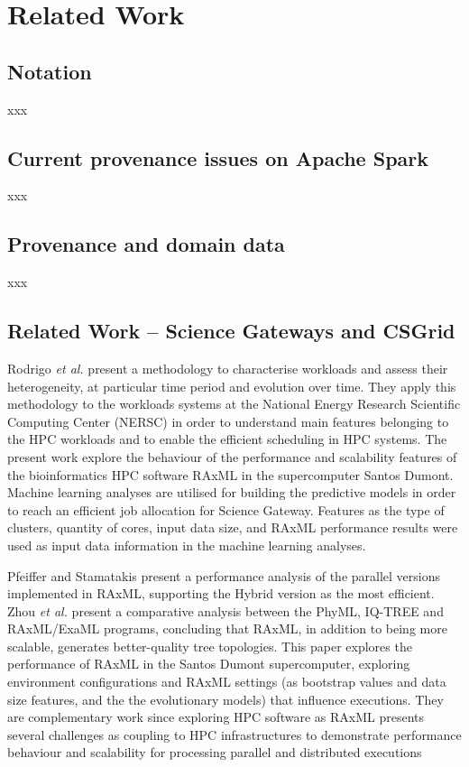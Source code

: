 \section{Related Work}\label{sec:background}


\subsection{Notation}

xxx


\subsection{Current provenance issues on Apache Spark}

xxx

\subsection{Provenance and domain data}\label{sec:provenance}

xxx

\subsection{Related Work -- Science Gateways and CSGrid}\label{sec:related}

Rodrigo \textit{et al.}
\cite{RODRIGO2018206} present a methodology to characterise workloads and assess their heterogeneity, at particular time period and evolution over time. They apply this methodology to the workloads systems at the National Energy Research Scientific Computing Center (NERSC) in order to understand main features belonging to the HPC workloads and to enable the efficient scheduling in HPC systems. The present work explore the behaviour of the performance and scalability features of the bioinformatics HPC software RAxML in the supercomputer Santos Dumont. Machine learning analyses are utilised for building the predictive models in order to reach an efficient job allocation for \system Science Gateway. Features as the type of clusters, quantity of cores, input data size, and RAxML performance results were used as input data information in the machine learning analyses.

Pfeiffer and  Stamatakis \cite{5470900} present a performance analysis of the parallel versions implemented in RAxML, supporting the Hybrid version as the most efficient. Zhou \textit{et al.} \cite{zhou2017phylo} present a comparative analysis between the PhyML, IQ-TREE and RAxML/ExaML programs, concluding that RAxML, in addition to being more scalable, generates better-quality tree topologies. This paper explores the performance of RAxML in the Santos Dumont supercomputer, exploring environment configurations and RAxML settings (as bootstrap values and data size features, and the the evolutionary models) that influence executions. They are complementary work since exploring HPC software as RAxML presents several challenges as coupling to HPC infrastructures to demonstrate performance behaviour and scalability for processing parallel and distributed executions

